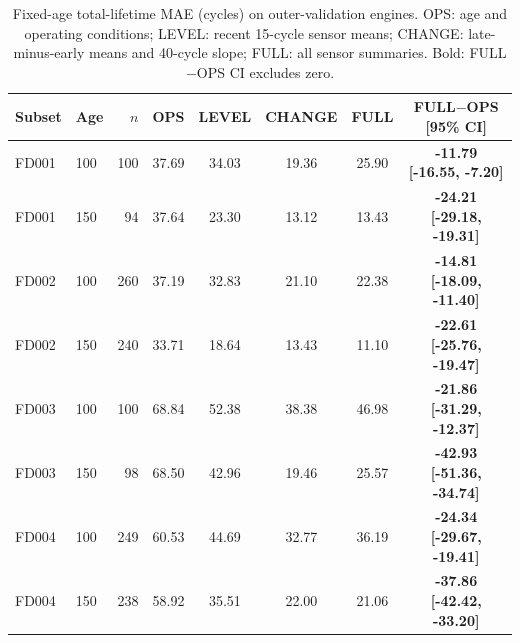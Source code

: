 \begin{table}[t]
\centering
\caption{Fixed-age total-lifetime MAE (cycles) on outer-validation engines. OPS: age and operating conditions; LEVEL: recent 15-cycle sensor means; CHANGE: late-minus-early means and 40-cycle slope; FULL: all sensor summaries. Bold: FULL$-$OPS CI excludes zero.}
\label{tab:measure}
\begin{tabular}{llrccccc}
\toprule
Subset & Age & $n$ & OPS & LEVEL & CHANGE & FULL & FULL$-$OPS [95\% CI] \\
\midrule
FD001 & 100 & 100 & 37.69 & 34.03 & 19.36 & 25.90 & \textbf{-11.79 [-16.55, -7.20]} \\
FD001 & 150 & 94 & 37.64 & 23.30 & 13.12 & 13.43 & \textbf{-24.21 [-29.18, -19.31]} \\
FD002 & 100 & 260 & 37.19 & 32.83 & 21.10 & 22.38 & \textbf{-14.81 [-18.09, -11.40]} \\
FD002 & 150 & 240 & 33.71 & 18.64 & 13.43 & 11.10 & \textbf{-22.61 [-25.76, -19.47]} \\
FD003 & 100 & 100 & 68.84 & 52.38 & 38.38 & 46.98 & \textbf{-21.86 [-31.29, -12.37]} \\
FD003 & 150 & 98 & 68.50 & 42.96 & 19.46 & 25.57 & \textbf{-42.93 [-51.36, -34.74]} \\
FD004 & 100 & 249 & 60.53 & 44.69 & 32.77 & 36.19 & \textbf{-24.34 [-29.67, -19.41]} \\
FD004 & 150 & 238 & 58.92 & 35.51 & 22.00 & 21.06 & \textbf{-37.86 [-42.42, -33.20]} \\
\bottomrule
\end{tabular}
\end{table}
